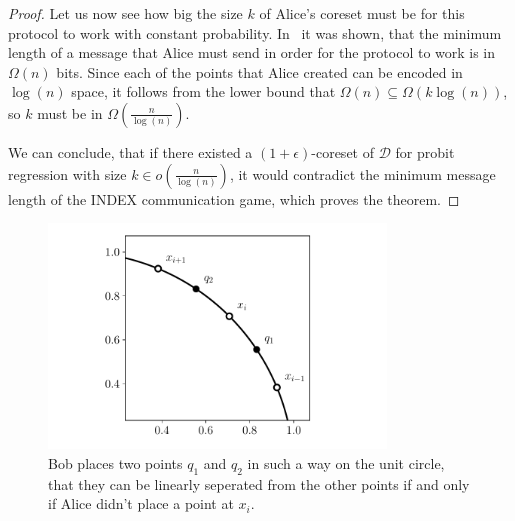 \begin{proof}

    Let us now see how big the size $k$ of Alice's coreset must be
    for this protocol to work with constant probability.
    In~\cite{index} it was shown, that the minimum length of a message
    that Alice must send in order for the protocol to work
    is in $\Omega(n)$ bits.
    Since each of the points that Alice created can be encoded in
    $\log(n)$ space, it follows from the lower bound that
    $\Omega(n) \subseteq \Omega(k \log(n))$, so $k$ must be in
    $\Omega\left(\frac{n}{\log(n)}\right)$.

    We can conclude, that if there existed a $(1 + \epsilon)$-coreset
    of $\mathcal{D}$
    for probit regression with size $k \in o\left(\frac{n}{\log(n)}\right)$,
    it would contradict the minimum message length of
    the INDEX communication game, which proves the theorem.
\end{proof}

\begin{figure}[h]
    \centering
    \includegraphics[width=0.8\textwidth]{figures/index.pdf}
    \caption{Bob places two points $q_1$ and $q_2$ in such a way
        on the unit circle, that they can be linearly seperated from the other
        points if and only if Alice didn't place a point at $x_i$.}
    \label{fig:index}
\end{figure}

